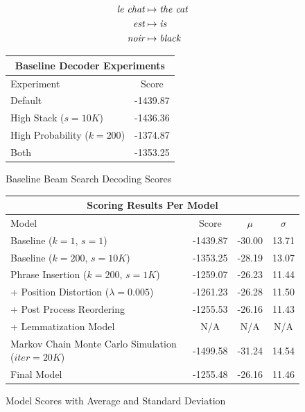 \documentclass[twoside,twocolumn]{article}
\begin{document}
\begin{equation}
\centering
\begin{split}
\textit{le chat} &\mapsto \textit{the cat} \\
\textit{est} &\mapsto \textit{is} \\
\textit{noir} &\mapsto \textit{black} \\
\end{split}
\end{equation}



\begin{figure}
\centering
\begin{tabular}{ |l|l| }
  \hline
  \multicolumn{2}{|c|}{Baseline Decoder Experiments} \\
  \hline
  Experiment & \multicolumn{1}{|c|}{Score} \\
  \hline
  Default & -1439.87 \\
  High Stack ($s=10K$) & -1436.36 \\
  High Probability ($k=200$) & -1374.87\\
  Both & -1353.25 \\
  \hline
\end{tabular}
\caption{Baseline Beam Search Decoding Scores}
\end{figure}

\begin{figure}[ht]
\centering
\begin{tabular}{ |l|l|l|l| }
  \hline
  \multicolumn{4}{|c|}{Scoring Results Per Model} \\
  \hline
  Model & \multicolumn{1}{|c|}{Score} & \multicolumn{1}{|c|}{$\mu$} & \multicolumn{1}{|c|}{$\sigma$} \\
  \hline
  Baseline ($k=1$, $s=1$) & -1439.87 & -30.00 & 13.71 \\
  Baseline ($k=200$, $s=10K$) & -1353.25 & -28.19 & 13.07 \\
  \hline
  Phrase Insertion ($k=200$, $s=1K$) & -1259.07 & -26.23 & 11.44 \\
  + Position Distortion ($\lambda=0.005$) & -1261.23 & -26.28 & 11.50 \\
  + Post Process Reordering & -1255.53 & -26.16 & 11.43 \\
  + Lemmatization Model & \multicolumn{1}{|c|}{N/A} & \multicolumn{1}{|c|}{N/A} & \multicolumn{1}{|c|}{N/A} \\
   \hline
   Markov Chain Monte Carlo Simulation ($iter=20K$) & -1499.58 & -31.24 & 14.54 \\
  \hline
  Final Model & -1255.48 & -26.16 & 11.46 \\
  \hline
\end{tabular}
\caption{Model Scores with Average and Standard Deviation}
\end{figure}
\end{document}

